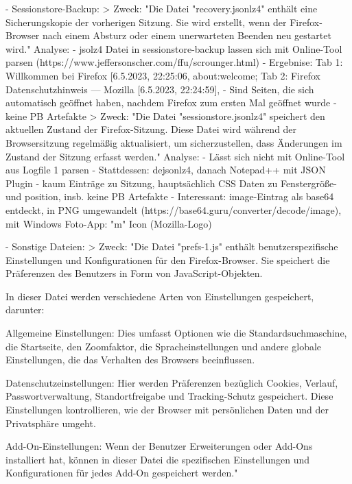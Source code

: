 - Sessionstore-Backup:
	> %
		Zweck:
			"Die Datei "recovery.jsonlz4" enthält eine Sicherungskopie der vorherigen Sitzung. Sie wird erstellt, wenn der Firefox-Browser nach einem Absturz oder einem unerwarteten Beenden neu gestartet wird." %
		Analyse:
			- jsolz4 Datei in sessionstore-backup lassen sich mit Online-Tool parsen (https://www.jeffersonscher.com/ffu/scrounger.html)
			- Ergebnise: 
				Tab 1:  Willkommen bei Firefox [6.5.2023, 22:25:06, about:welcome;
				Tab 2:  Firefox Datenschutzhinweis — Mozilla [6.5.2023, 22:24:59], %
			- Sind Seiten, die sich automatisch geöffnet haben, nachdem Firefox zum ersten Mal geöffnet wurde
			- keine PB Artefakte
	> %
		Zweck: "Die Datei "sessionstore.jsonlz4" speichert den aktuellen Zustand der Firefox-Sitzung.  Diese Datei wird während der Browsersitzung regelmäßig aktualisiert, um sicherzustellen, dass Änderungen im Zustand der Sitzung erfasst werden."
		Analyse:
			- Lässt sich nicht mit Online-Tool aus Logfile 1 parsen
			- Stattdessen: dejsonlz4, danach Notepad++ mit JSON Plugin
			- kaum Einträge zu Sitzung, hauptsächlich CSS Daten zu Fenstergröße- und position, insb. keine PB Artefakte
			- Interessant: image-Eintrag als base64 entdeckt, in PNG umgewandelt (https://base64.guru/converter/decode/image), mit Windows Foto-App: "m" Icon (Mozilla-Logo)

- Sonstige Dateien:
	> %
		Zweck:
			"Die Datei "prefs-1.js" enthält benutzerspezifische Einstellungen und Konfigurationen für den Firefox-Browser. Sie speichert die Präferenzen des Benutzers in Form von JavaScript-Objekten.

			In dieser Datei werden verschiedene Arten von Einstellungen gespeichert, darunter:
			
		   Allgemeine Einstellungen: Dies umfasst Optionen wie die Standardsuchmaschine, die Startseite, den Zoomfaktor, die Spracheinstellungen und andere globale Einstellungen, die das Verhalten des Browsers beeinflussen.
							
		   Datenschutzeinstellungen: Hier werden Präferenzen bezüglich Cookies, Verlauf, Passwortverwaltung, Standortfreigabe und Tracking-Schutz gespeichert. Diese Einstellungen kontrollieren, wie der Browser mit persönlichen Daten und der Privatsphäre umgeht.
							
		   Add-On-Einstellungen: Wenn der Benutzer Erweiterungen oder Add-Ons installiert hat, können in dieser Datei die spezifischen Einstellungen und Konfigurationen für jedes Add-On gespeichert werden."

